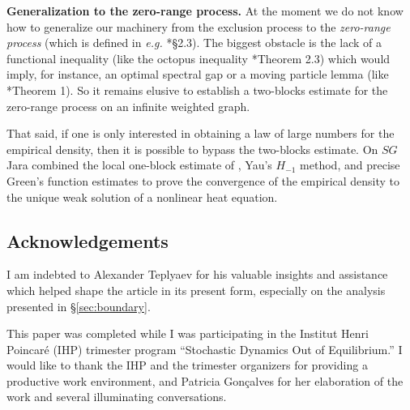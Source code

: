 \documentclass[11pt]{amsart}
\theoremstyle{plain}
\theoremstyle{definition}
\theoremstyle{remark}
\begin{document}
\textbf{Generalization to the zero-range process.}
At the moment we do not know how to generalize our machinery from the exclusion process to the \emph{zero-range process} (which is defined in \emph{e.g.\@} \cite{KipnisLandim}*{\S2.3}). The biggest obstacle is the lack of a functional inequality (like the octopus inequality \cite{CLR09}*{Theorem 2.3}) which would imply, for instance, an optimal spectral gap or a moving particle lemma (like \cite{ChenMPL}*{Theorem 1}). So it remains elusive to establish a two-blocks estimate for the zero-range process on an infinite weighted graph.

That said, if one is only interested in obtaining a law of large numbers for the empirical density, then it is possible to bypass the two-blocks estimate. On $SG$ Jara \cite{Jara} combined the local one-block estimate of \cite{JLSLocal}, Yau's $H_{-1}$ method, and precise Green's function estimates to prove the convergence of the empirical density to the unique weak solution of a nonlinear heat equation.



\subsection*{Acknowledgements}

I am indebted to Alexander Teplyaev for his valuable insights and assistance which helped shape the article in its present form, especially on the analysis presented in \S\ref{sec:boundary}.

This paper was completed while I was participating in the Institut Henri Poincar\'e (IHP) trimester program ``Stochastic Dynamics Out of Equilibrium.'' I would like to thank the IHP and the trimester organizers for providing a productive work environment, and Patricia Gon\c calves for her elaboration of the work \cite{BMNS} and several illuminating conversations.
\end{document}
